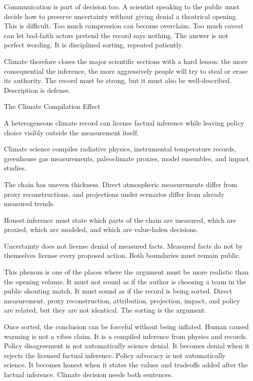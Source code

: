 Communication is part of decision too. A scientist speaking to the public
must decide how to preserve uncertainty without giving denial a theatrical
opening. This is difficult. Too much compression can become overclaim. Too
much caveat can let bad-faith actors pretend the record says nothing. The
answer is not perfect wording. It is disciplined sorting, repeated patiently.

Climate therefore closes the major scientific sections with a hard lesson:
the more consequential the inference, the more aggressively people will try
to steal or erase its authority. The record must be strong, but it must also
be well-described. Description is defense.

\begin{phenom}{The Climate Compilation Effect~\cite{arrhenius1896,ipcc2021}}
\label{ph:climate-compilation}

\PhStatement
A heterogeneous climate record can license factual inference while leaving
policy choice visibly outside the measurement itself.

\PhOrigin
Climate science compiles radiative physics, instrumental temperature records,
greenhouse gas measurements, paleoclimate proxies, model ensembles, and impact
studies.

\PhObservation
The chain has uneven thickness. Direct atmospheric measurements differ from
proxy reconstructions, and projections under scenarios differ from already
measured trends.

\PhConstraint
Honest inference must state which parts of the chain are measured, which are
proxied, which are modeled, and which are value-laden decisions.

\PhConsequence
Uncertainty does not license denial of measured facts. Measured facts do not by
themselves license every proposed action. Both boundaries must remain public.
\end{phenom}

This phenom is one of the places where the argument must be more realistic
than the opening volume. It must not sound as if the author is choosing a team in the public
shouting match. It must sound as if the record is being sorted. Direct
measurement, proxy reconstruction, attribution, projection, impact, and policy
are related, but they are not identical. The sorting is the argument.

Once sorted, the conclusion can be forceful without being inflated. Human
caused warming is not a vibes claim. It is a compiled inference from physics
and records. Policy disagreement is not automatically science denial. It
becomes denial when it rejects the licensed factual inference. Policy advocacy
is not automatically science. It becomes honest when it states the values and
tradeoffs added after the factual inference. Climate decision needs both
sentences.

